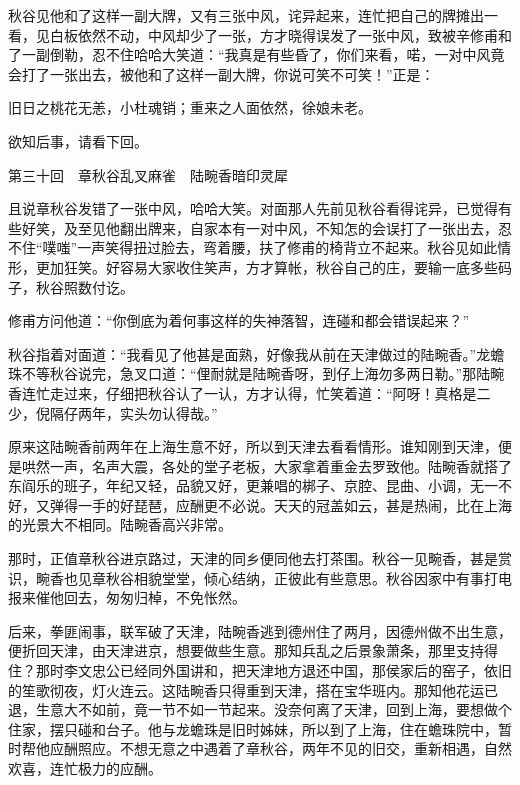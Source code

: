 \documentclass[12pt,UTF8]{ctexbook}
\begin{document}
{{{秋谷见他和了这样一副大牌，又有三张中风，诧异起来，连忙把自己的牌摊出一看，见白板依然不动，中风却少了一张，方才晓得误发了一张中风，致被辛修甫和了一副倒勒，忍不住哈哈大笑道：“我真是有些昏了，你们来看，喏，一对中风竟会打了一张出去，被他和了这样一副大牌，你说可笑不可笑！”正是：

旧日之桃花无恙，小杜魂销；重来之人面依然，徐娘未老。

欲知后事，请看下回。





第三十回　章秋谷乱叉麻雀　陆畹香暗印灵犀





且说章秋谷发错了一张中风，哈哈大笑。对面那人先前见秋谷看得诧异，已觉得有些好笑，及至见他翻出牌来，自家本有一对中风，不知怎的会误打了一张出去，忍不住“噗嗤”一声笑得扭过脸去，弯着腰，扶了修甫的椅背立不起来。秋谷见如此情形，更加狂笑。好容易大家收住笑声，方才算帐，秋谷自己的庄，要输一底多些码子，秋谷照数付讫。

修甫方问他道：“你倒底为着何事这样的失神落智，连碰和都会错误起来？”

秋谷指着对面道：“我看见了他甚是面熟，好像我从前在天津做过的陆畹香。”龙蟾珠不等秋谷说完，急叉口道：“俚耐就是陆畹香呀，到仔上海勿多两日勒。”那陆畹香连忙走过来，仔细把秋谷认了一认，方才认得，忙笑着道：“阿呀！真格是二少，倪隔仔两年，实头勿认得哉。”

原来这陆畹香前两年在上海生意不好，所以到天津去看看情形。谁知刚到天津，便是哄然一声，名声大震，各处的堂子老板，大家拿着重金去罗致他。陆畹香就搭了东阎乐的班子，年纪又轻，品貌又好，更兼唱的梆子、京腔、昆曲、小调，无一不好，又弹得一手的好琵琶，应酬更不必说。天天的冠盖如云，甚是热闹，比在上海的光景大不相同。陆畹香高兴非常。

那时，正值章秋谷进京路过，天津的同乡便同他去打茶围。秋谷一见畹香，甚是赏识，畹香也见章秋谷相貌堂堂，倾心结纳，正彼此有些意思。秋谷因家中有事打电报来催他回去，匆匆归棹，不免怅然。

后来，拳匪闹事，联军破了天津，陆畹香逃到德州住了两月，因德州做不出生意，便折回天津，由天津进京，想要做些生意。那知兵乱之后景象萧条，那里支持得住？那时李文忠公已经同外国讲和，把天津地方退还中国，那侯家后的窑子，依旧的笙歌彻夜，灯火连云。这陆畹香只得重到天津，搭在宝华班内。那知他花运已退，生意大不如前，竟一节不如一节起来。没奈何离了天津，回到上海，要想做个住家，摆只碰和台子。他与龙蟾珠是旧时姊妹，所以到了上海，住在蟾珠院中，暂时帮他应酬照应。不想无意之中遇着了章秋谷，两年不见的旧交，重新相遇，自然欢喜，连忙极力的应酬。

}}}
\end{document}
